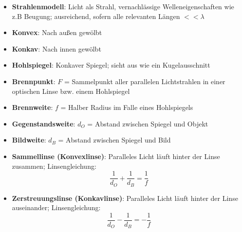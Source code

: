\begin{itemize}
	\item \textbf{Strahlenmodell}: Licht als Strahl, vernachlässige Welleneigenschaften wie z.B Beugung; ausreichend, sofern alle relevanten Längen $<< \lambda$
	\item \textbf{Konvex}: Nach außen gewölbt
	\item \textbf{Konkav}: Nach innen gewölbt
	\item \textbf{Hohlspiegel}: Konkaver Spiegel; sieht aus wie ein Kugelausschnitt
	\item \textbf{Brennpunkt}: $F$ = Sammelpunkt aller parallelen Lichtstrahlen in einer optischen Linse bzw. einem Hohlspiegel
	\item \textbf{Brennweite}: $f$ = Halber Radius im Falle eines Hohlspiegels
	\item \textbf{Gegenstandsweite}: $d_O$ = Abstand zwischen Spiegel und Objekt
	\item \textbf{Bildweite}: $d_B$ = Abstand zwischen Spiegel und Bild
	\item \textbf{Sammellinse (Konvexlinse)}: Paralleles Licht läuft hinter der Linse zusammen; Linsengleichung:
	\begin{equation}
		\frac{1}{d_O} + \frac{1}{d_B} = \frac{1}{f}		
	\end{equation}
	\item \textbf{Zerstreuungslinse (Konkavlinse)}: Paralleles Licht läuft hinter der Linse auseinander; Linsengleichung:
	\begin{equation}
		\frac{1}{d_O} - \frac{1}{d_B} = -\frac{1}{f}
	\end{equation}
\end{itemize}